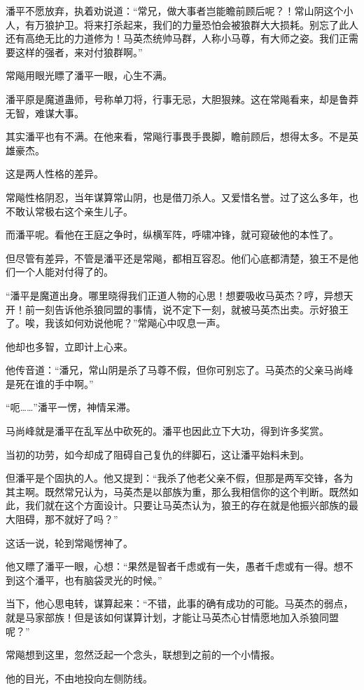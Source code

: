 \begin{this_body}
潘平不愿放弃，执着劝说道：“常兄，做大事者岂能瞻前顾后呢？！常山阴这个小人，有万狼护卫。将来打杀起来，我们的力量恐怕会被狼群大大损耗。别忘了此人还有高绝无比的力道修为！马英杰统帅马群，人称小马尊，有大师之姿。我们正需要这样的强者，来对付狼群啊。”

常飚用眼光瞟了潘平一眼，心生不满。

潘平原是魔道蛊师，号称单刀将，行事无忌，大胆狠辣。这在常飚看来，却是鲁莽无智，难谋大事。

其实潘平也有不满。在他来看，常飚行事畏手畏脚，瞻前顾后，想得太多。不是英雄豪杰。

这是两人性格的差异。

常飚性格阴忍，当年谋算常山阴，也是借刀杀人。又爱惜名誉。过了这么多年，也不敢认常极右这个亲生儿子。

而潘平呢。看他在王庭之争时，纵横军阵，呼啸冲锋，就可窥破他的本性了。

但尽管有差异，不管是潘平还是常飚，都相互容忍。他们心底都清楚，狼王不是他们一个人能对付得了的。

“潘平是魔道出身。哪里晓得我们正道人物的心思！想要吸收马英杰？哼，异想天开！前一刻告诉他杀狼同盟的事情，说不定下一刻，就被马英杰出卖。示好狼王了。唉，我该如何劝说他呢？”常飚心中叹息一声。

他却也多智，立即计上心来。

他传音道：“潘兄，常山阴是杀了马尊不假，但你可别忘了。马英杰的父亲马尚峰是死在谁的手中啊。”

“呃……”潘平一愣，神情呆滞。

马尚峰就是潘平在乱军丛中砍死的。潘平也因此立下大功，得到许多奖赏。

当初的功劳，如今却成了阻碍自己复仇的绊脚石，这让潘平始料未到。

但潘平是个固执的人。他又提到：“我杀了他老父亲不假，但那是两军交锋，各为其主啊。既然常兄认为，马英杰是以部族为重，那么我相信你的这个判断。既然如此，我们就在这个方面设计。只要让马英杰认为，狼王的存在就是他振兴部族的最大阻碍，那不就好了吗？”

这话一说，轮到常飚愣神了。

他又瞟了潘平一眼，心想：“果然是智者千虑或有一失，愚者千虑或有一得。想不到这个潘平，也有脑袋灵光的时候。”

当下，他心思电转，谋算起来：“不错，此事的确有成功的可能。马英杰的弱点，就是马家部族！但是该如何谋算计划，才能让马英杰心甘情愿地加入杀狼同盟呢？”

常飚想到这里，忽然泛起一个念头，联想到之前的一个小情报。

他的目光，不由地投向左侧防线。


\end{this_body}
